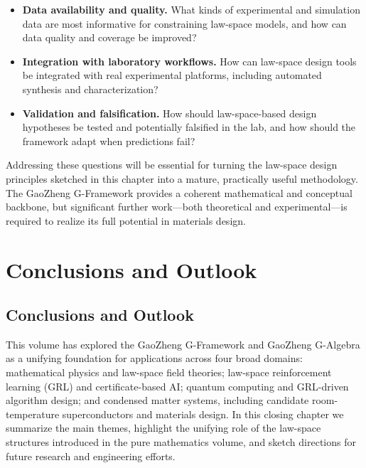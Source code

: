 \documentclass[11pt]{book}
\theoremstyle{plain}
\theoremstyle{definition}
\theoremstyle{remark}
\begin{document}
\begin{itemize}
  \item \textbf{Data availability and quality.}
        What kinds of experimental and simulation data are most
        informative for constraining law-space models, and how can
        data quality and coverage be improved?
  \item \textbf{Integration with laboratory workflows.}
        How can law-space design tools be integrated with real
        experimental platforms, including automated synthesis and
        characterization?
  \item \textbf{Validation and falsification.}
        How should law-space-based design hypotheses be tested and
        potentially falsified in the lab, and how should the
        framework adapt when predictions fail?
\end{itemize}

Addressing these questions will be essential for turning the
law-space design principles sketched in this chapter into a
mature, practically useful methodology. The GaoZheng G-Framework
provides a coherent mathematical and conceptual backbone, but
significant further work—both theoretical and experimental—is
required to realize its full potential in materials design.



\part*{Conclusions and Outlook}

\chapter*{Conclusions and Outlook}




This volume has explored the GaoZheng G-Framework and GaoZheng
G-Algebra as a unifying foundation for applications across four
broad domains: mathematical physics and law-space field theories;
law-space reinforcement learning (GRL) and certificate-based AI;
quantum computing and GRL-driven algorithm design; and condensed
matter systems, including candidate room-temperature superconductors
and materials design. In this closing chapter we summarize the main
themes, highlight the unifying role of the law-space structures
introduced in the pure mathematics volume\cite{GaoZheng2025GFramework},
and sketch directions for future research and engineering efforts.
\end{document}
